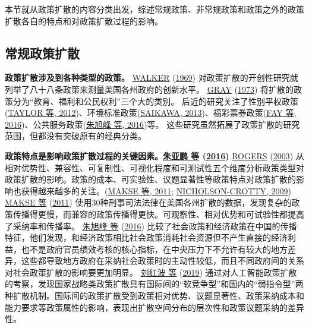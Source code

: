 \documentclass[
  12pt,
]{ctexart}
\begin{document}
本节就从政策扩散的内容分类出发，综述常规政策、非常规政策和政策之外的政策扩散各自的特点和对政策扩散过程的影响。

\hypertarget{ux5e38ux89c4ux653fux7b56ux6269ux6563}{%
\subsection{常规政策扩散}\label{ux5e38ux89c4ux653fux7b56ux6269ux6563}}

\textbf{政策扩散涉及到各种类型的政策。}
\protect\hyperlink{ref-Walker1969}{WALKER} (\protect\hyperlink{ref-Walker1969}{1969}) 对政策扩散的开创性研究就列举了八十八条政策来测量美国各州政府的创新水平。
\protect\hyperlink{ref-Gray1973}{GRAY} (\protect\hyperlink{ref-Gray1973}{1973}) 将扩散的政策分为``教育、福利和公民权利''三个大的类别。
后近的研究关注了性别平权政策(\protect\hyperlink{ref-TaylorEtAl2012}{TAYLOR 等, 2012})、环境标准政策(\protect\hyperlink{ref-Saikawa2013}{SAIKAWA, 2013})、福彩票券政策(\protect\hyperlink{ref-FayWenger2016}{FAY 等, 2016})、公共服务政策(\protect\hyperlink{ref-ZhuXuFengZhaoHui2016}{朱旭峰 等, 2016})等。
这些研究虽然拓展了政策扩散的研究范围，但都没有突破原有的经典分类。

\textbf{政策特点是影响政策扩散过程的关键因素。\protect\hyperlink{ref-ZhuYaPengDingShuJuan2016}{朱亚鹏 等} (\protect\hyperlink{ref-ZhuYaPengDingShuJuan2016}{2016})}
\protect\hyperlink{ref-Rogers2003}{ROGERS} (\protect\hyperlink{ref-Rogers2003}{2003}) 从相对优势性、兼容性、可复制性、可视化程度和可测试性五个维度分析政策类型对政策扩散的影响。政策的成本、可实验性、议题显著性等政策特点对政策扩散的影响也获得越来越多的关注。(\protect\hyperlink{ref-MakseVolden2011}{MAKSE 等, 2011}; \protect\hyperlink{ref-Nicholson-Crotty2009}{NICHOLSON-CROTTY, 2009})
\protect\hyperlink{ref-MakseVolden2011}{MAKSE 等} (\protect\hyperlink{ref-MakseVolden2011}{2011}) 使用30种刑事司法法律在美国各州扩散的数据，发现复杂的政策传播得更慢，而兼容的政策传播得更快。可观察性、相对优势和可试验性都提高了采纳率和传播率。
\protect\hyperlink{ref-ZhuXuFengZhaoHui2016}{朱旭峰 等} (\protect\hyperlink{ref-ZhuXuFengZhaoHui2016}{2016}) 比较了社会政策和经济政策在中国的传播特征，他们发现，和经济政策相比社会政策消耗社会资源但不产生直接的经济利益，也不是政府官员绩效考核的核心指标，在中央压力下不允许有较大的地方差异，这些都导致地方政府在采纳社会政策时的主动性较低，而且不同政府间的关系对社会政策扩散的影响要更加明显。
\protect\hyperlink{ref-LiuHongBoLinBin2019}{刘红波 等} (\protect\hyperlink{ref-LiuHongBoLinBin2019}{2019}) 通过对人工智能政策扩散的考察，发现国家战略类政策扩散具有国际间的``软竞争型''和国内的``弱指令型''两种扩散机制。国际间的政策扩散受到政策相对优势、议题显著性、政策采纳成本和能力要求等政策属性的影响，表现出扩散空间分布的层次性和政策议题采纳的差异性。
\end{document}
